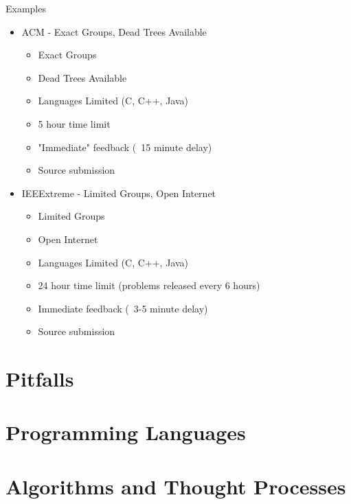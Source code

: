 \documentclass{beamer}
\begin{document}
\begin{frame}{Examples}
  \begin{centering}
    \begin{itemize}
      \item ACM - Exact Groups, Dead Trees Available
      \begin{itemize}
        \item Exact Groups
        \item Dead Trees Available
        \item Languages Limited (C, C++, Java)
        \item 5 hour time limit
        \item "Immediate" feedback (~15 minute delay)
        \item Source submission
      \end{itemize}
      \pause
      \item IEEExtreme - Limited Groups, Open Internet
      \begin{itemize}
        \item Limited Groups
        \item Open Internet
        \item Languages Limited (C, C++, Java)
        \item 24 hour time limit (problems released every 6 hours)
        \item Immediate feedback (~3-5 minute delay)
        \item Source submission
      \end{itemize}
    \end{itemize}
  \end{centering}
\end{frame}

  
  

\section{Pitfalls}

\section{Programming Languages}

\section{Algorithms and Thought Processes}
\end{document}
